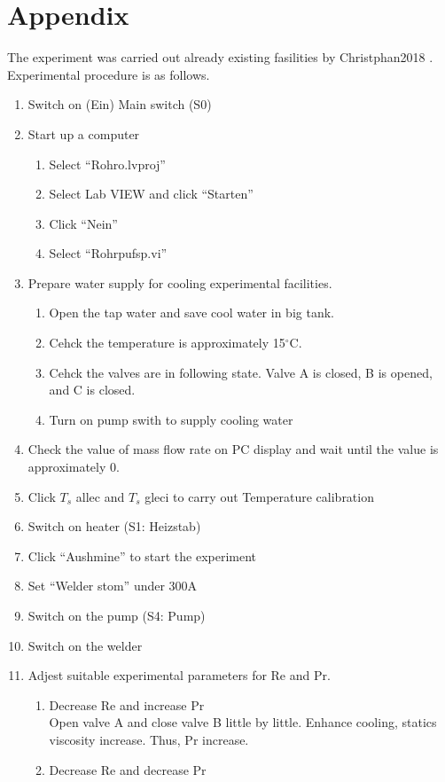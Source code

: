 \documentclass[conference]{IEEEtran}
\begin{document}
\section{Appendix}
The experiment was carried out already existing fasilities by Christphan2018 \cite{Christphan2018}.
Experimental procedure is as follows.
\begin{enumerate}
  \item Switch on (Ein) Main switch (S0)
  \item Start up a computer
  \begin{enumerate}
      \item Select ``Rohro.lvproj''
      \item Select Lab VIEW and click ``Starten''
      \item Click ``Nein''
      \item Select ``Rohrpufsp.vi''
  \end{enumerate}
  \item Prepare water supply for cooling experimental facilities.
  \begin{enumerate}
      \item Open the tap water and save cool water in big tank.
      \item Cehck the temperature is approximately 15$^\circ$C.
      \item Cehck the valves are in following state.
      Valve A is closed, B is opened, and C is closed.
      \item Turn on pump swith to supply cooling water
  \end{enumerate}
  \item Check the value of mass flow rate on PC display and wait until the value is approximately 0.
  \item Click $T_{s}$ allec and $T_{s}$ gleci to carry out Temperature calibration
  \item Switch on heater (S1: Heizstab)
  \item Click ``Aushmine'' to start the experiment
  \item Set ``Welder stom'' under 300A
  \item Switch on the pump (S4: Pump)
  \item Switch on the welder
  \item Adjest suitable experimental parameters for Re and Pr.
  \begin{enumerate}
      \item Decrease Re and increase Pr\\
      Open valve A and close valve B little by little.
      Enhance cooling, statics viscosity increase.
      Thus, Pr increase.
      \item Decrease Re and decrease Pr\\


\end{enumerate}
\end{enumerate}
\end{document}
